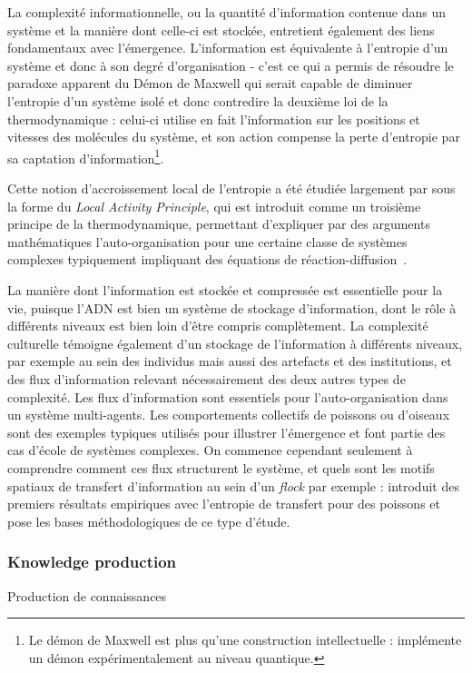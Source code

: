 La complexité informationnelle, ou la quantité d'information contenue dans un système et la manière dont celle-ci est stockée, entretient également des liens fondamentaux avec l'émergence. L'information est équivalente à l'entropie d'un système et donc à son degré d'organisation - c'est ce qui a permis de résoudre le paradoxe apparent du Démon de Maxwell qui serait capable de diminuer l'entropie d'un système isolé et donc contredire la deuxième loi de la thermodynamique : celui-ci utilise en fait l'information sur les positions et vitesses des molécules du système, et son action compense la perte d'entropie par sa captation d'information\footnote{Le démon de Maxwell est plus qu'une construction intellectuelle : \cite{cottet2017observing} implémente un démon expérimentalement au niveau quantique.}.

Cette notion d'accroissement local de l'entropie a été étudiée largement par  sous la forme du \emph{Local Activity Principle}, qui est introduit comme un troisième principe de la thermodynamique, permettant d'expliquer par des arguments mathématiques l'auto-organisation pour une certaine classe de systèmes complexes typiquement impliquant des équations de réaction-diffusion~\cite{mainzer2013local}.


La manière dont l'information est stockée et compressée est essentielle pour la vie, puisque l'ADN est bien un système de stockage d'information, dont le rôle à différents niveaux est bien loin d'être compris complètement. La complexité culturelle témoigne également d'un stockage de l'information à différents niveaux, par exemple au sein des individus mais aussi des artefacts et des institutions, et des flux d'information relevant nécessairement des deux autres types de complexité. Les flux d'information sont essentiels pour l'auto-organisation dans un système multi-agents. Les comportements collectifs de poissons ou d'oiseaux sont des exemples typiques utilisés pour illustrer l'émergence et font partie des cas d'école de systèmes complexes. On commence cependant seulement à comprendre comment ces flux structurent le système, et quels sont les motifs spatiaux de transfert d'information au sein d'un \emph{flock} par exemple : \cite{crosato2017informative} introduit des premiers résultats empiriques avec l'entropie de transfert pour des poissons et pose les bases méthodologiques de ce type d'étude.




\subsubsection{Knowledge production}{Production de connaissances}

